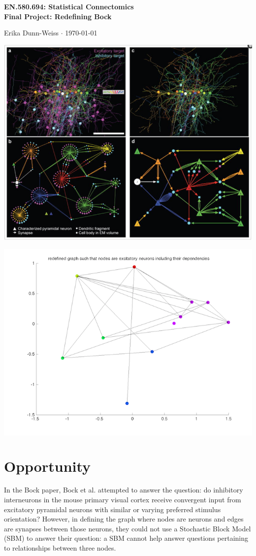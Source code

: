 \documentclass[12pt]{article}
\begin{document}
\begin{center}\Large \bf EN.580.694: Statistical Connectomics \\ Final Project: Redefining Bock \end{center}
\begin{center} Erika Dunn-Weiss $\cdot$  \today \end{center}
\bigskip


\includegraphics{OriginalBockGraphs.png}
\bigskip

\includegraphics{redefinedGraph.png}

\section*{Opportunity}  In the Bock paper, Bock et al. attempted to answer the question: do inhibitory interneurons in the mouse primary visual cortex receive convergent input from excitatory pyramidal neurons with similar or varying preferred stimulus orientation? However, in defining the graph where nodes are neurons and edges are synapses between those neurons, they could not use a Stochastic Block Model (SBM) to answer their question: a SBM cannot help answer questions pertaining to relationships between three nodes. 
\end{document}
